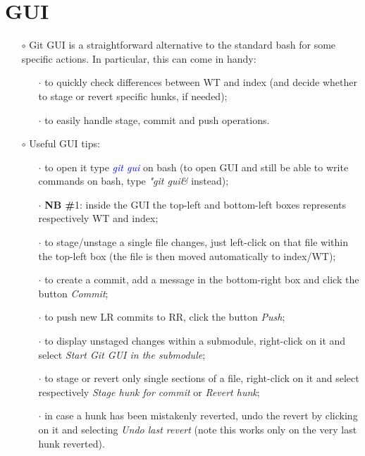 \documentclass[a4paper,portrait,10pt]{article}   %
\newcommand{\mybulletlvA}{$\circ$}   %
\newcommand{\mybulletlvB}{$\cdot$}   %
\newcommand{\mycmd}[1]{\textcolor{blue}{\textit{#1}}}   %
\newcommand{\myvspace}{\vspace{4mm}}   %
\begin{document}
\section{GUI}   \label{sec:GUI}

\begin{itemize}
\item[\mybulletlvA] Git GUI is a straightforward alternative to the standard bash for some specific actions. In particular, this can come in handy:
\begin{itemize}
  \item[\mybulletlvB] to quickly check differences between WT and index (and decide whether to stage or revert specific hunks, if needed);
  \item[\mybulletlvB] to easily handle stage, commit and push operations.
\end{itemize}
\myvspace

\item[\mybulletlvA] Useful GUI tips:
\begin{itemize}
  \item[\mybulletlvB] to open it type \mycmd{git gui} on bash (to open GUI and still be able to write commands on bash, type \textit{"git gui\&} instead);
  \item[\mybulletlvB] \textbf{NB \#}1: inside the GUI the top-left and bottom-left boxes represents respectively WT and index;
  \item[\mybulletlvB] to stage/unstage a single file changes, just left-click on that file within the top-left box (the file is then moved automatically to index/WT);
  \item[\mybulletlvB] to create a commit, add a message in the bottom-right box and click the button \textit{Commit};
  \item[\mybulletlvB] to push new LR commits to RR, click the button \textit{Push};
  \item[\mybulletlvB] to display unstaged changes within a submodule, right-click on it and select \textit{Start Git GUI in the submodule};
  \item[\mybulletlvB] to stage or revert only single sections of a file, right-click on it and select respectively \textit{Stage hunk for commit} or \textit{Revert hunk};
  \item[\mybulletlvB] in case a hunk has been mistakenly reverted, undo the revert by clicking on it and selecting \textit{Undo last revert} (note this works only on the very last hunk reverted).
\end{itemize}
\end{itemize}
\myvspace
\end{document}
